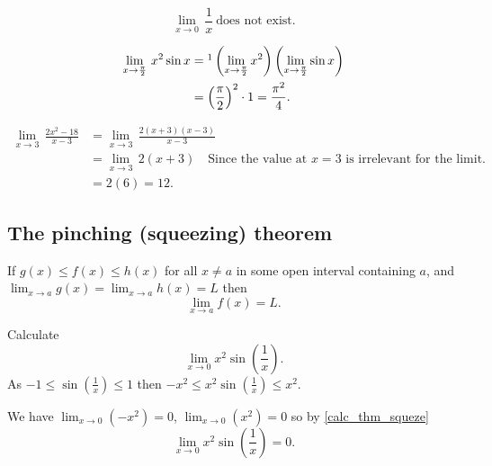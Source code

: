 \documentclass[10pt, a4paper]{article}
\begin{document}
\begin{example}
    \[
    \lim_{x \rightarrow 0}\,\frac{1}{x}\ \text{does not exist.}
    \]
\end{example}

\begin{example}
    \begin{align*}
    \lim_{x \rightarrow \frac{\pi}{2}}\,x ^ 2 \sin x &=\footnotemark \left(\lim_{x \rightarrow \frac{\pi}{2}} x^ 2 \right)\left(\lim_{x \rightarrow \frac{\pi}{2}} \sin x\right) \\
    &= \left(\frac{\pi}{2}\right) ^ 2 \cdot 1 = \frac{\pi ^ 2}{4}.
    \end{align*}
\end{example}

\begin{example}
    \begin{align*}
    \lim_{x \rightarrow 3}\,\frac{2x ^ 2 - 18}{x - 3} &= \lim_{x \rightarrow 3}\, \frac{2(x + 3)(x - 3)}{x - 3} \\
    &= \lim_{x \rightarrow 3}\,2(x + 3)\quad\text{Since the value at $x = 3$ is irrelevant for the limit.} \\
    &= 2(6) = 12.
    \end{align*}
\end{example}

\subsection{The pinching (squeezing) theorem}
\begin{theorem}\label{calc_thm_squeze}
    If $g(x) \leq f(x) \leq h(x)$ for all $x \neq a$ in some open interval containing $a$, and $\displaystyle \lim_{x \rightarrow a}g(x) = \lim_{x \rightarrow a} h(x) = L$ then
    \[
    \lim_{x \rightarrow a}f(x) = L.
    \]
\end{theorem}

\begin{example}
    Calculate
    \[
    \lim_{x \rightarrow 0} x ^ 2 \sin \left(\frac{1}{x}\right).
    \]
    As $-1 \leq \sin \left(\frac{1}{x}\right) \leq 1$ then $-x ^ 2 \leq x ^ 2 \sin \left(\frac{1}{x}\right) \leq x ^ 2$.

    We have $\lim_{x \rightarrow 0}(-x ^ 2) = 0$, $\lim_{x \rightarrow 0}(x ^ 2) = 0$ so by \autoref{calc_thm_squeze}
    \[
    \lim_{x \rightarrow 0} x ^ 2 \sin \left(\frac{1}{x}\right) = 0.
    \]
\end{example}
\end{document}
